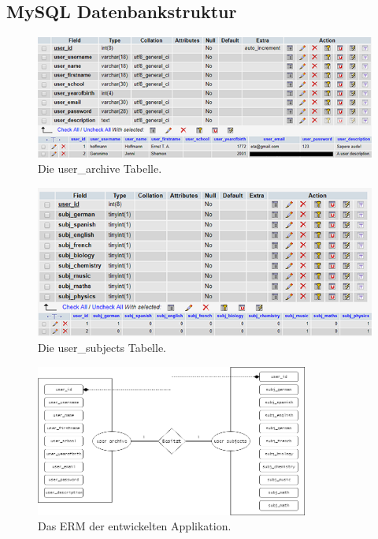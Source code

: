 \documentclass[a4paper,11pt]{report}
\begin{document}
				\subsection{MySQL Datenbankstruktur} \label{databankstructure}
				
				\begin{figure}
					\begin{center}
						\includegraphics{user_archive.png}
						\caption{Die user\_archive Tabelle.}
						\label{user_archive:PNG}
					\end{center}
				\end{figure}
				\begin{figure}
					\begin{center}
						\includegraphics{user_subjects.png}
						\caption{Die user\_subjects Tabelle.}
						\label{user_subjects:PNG}
					\end{center}
				\end{figure}
				\begin{figure}
					\begin{center}
						\includegraphics[width=0.8\textwidth]{ERM-Matura.png}
						\caption{Das ERM der entwickelten Applikation.}
						\label{ERM}
					\end{center}
				\end{figure}
				
\end{document}
